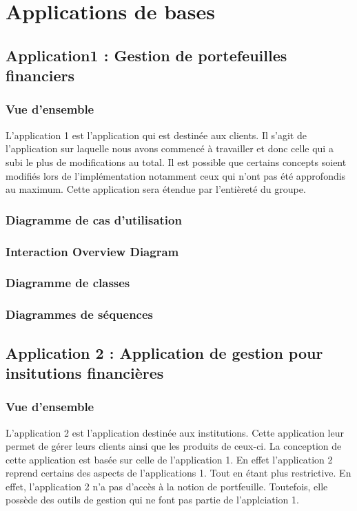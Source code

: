 \documentclass{article}
\begin{document}
\section{Applications de bases}

	\subsection{Application1 : Gestion de portefeuilles financiers}

		\subsubsection{Vue d'ensemble}
			L'application 1 est l'application qui est destinée aux clients. Il s'agit de l'application sur
			laquelle nous avons commencé à travailler et donc celle qui a subi le plus de modifications au total.
			Il est possible que certains concepts soient modifiés lors de l'implémentation notamment ceux qui 
			n'ont pas été approfondis au maximum. Cette application sera étendue par l'entièreté du groupe.
		\newpage
		\subsubsection{Diagramme de cas d'utilisation}
				
				
		\subsubsection{Interaction Overview Diagram}
		
				
		
		\subsubsection{Diagramme de classes}
				
		\newpage
		\subsubsection{Diagrammes de séquences}

                
		
	\subsection{Application 2 : Application de gestion pour insitutions financières}

		\subsubsection{Vue d'ensemble}
			L'application 2 est l'application destinée aux institutions. Cette application leur permet de gérer 
			leurs clients ainsi que les produits de ceux-ci. La conception de cette application est basée sur celle 
			de l'application 1. En effet l'application 2 reprend certains des aspects de l'applications 1. Tout 
			en étant plus restrictive. En effet, l'application 2 n'a pas d'accès à la notion de portfeuille. 
			Toutefois, elle possède des outils de gestion qui ne font pas partie de l'applciation 1.
\end{document}
